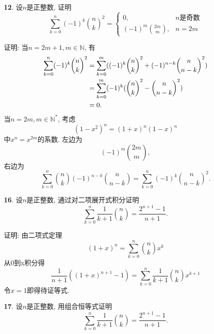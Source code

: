 \par \textbf{12}. 设$n$是正整数, 证明
\begin{displaymath}
\sum^{n}_{k=0}(-1)^{k}\binom{n}{k}^2=
\begin{cases}
0,& n\text{是奇数}\\
(-1)^m\binom{2m}{m}, & n=2m
\end{cases}
\end{displaymath}
\par 证明: 当$n=2m+1,m\in\mathbb{N}$, 有
\begin{align*}
\sum^{n}_{k=0}(-1)^{k}\binom{n}{k}^2
&=\sum^{m}_{k=0}((-1)^{k}\binom{n}{k}^2+(-1)^{n-k}\binom{n}{n-k}^2)\notag\\
&=\sum^{m}_{k=0}(-1)^{k}(\binom{n}{k}^2-\binom{n}{n-k}^2)\notag\\
&=0. \notag
\end{align*}
当$n=2m,m\in\mathbb{N}^*$, 考虑
\begin{displaymath}
(1-x^2)^n=(1+x)^n(1-x)^n
\end{displaymath}
中$x^n=x^{2m}$的系数. 左边为
\begin{displaymath}
(-1)^m\binom{2m}{m},
\end{displaymath}
右边为
\begin{displaymath}
\sum_{k=0}^n\binom{n}{k}(-1)^{n-k}\binom{n}{n-k}=
\sum_{k=0}^n(-1)^{k}\binom{n}{n-k}^2.
\end{displaymath}

\par \textbf{16}. 设$n$是正整数, 通过对二项展开式积分证明
\begin{displaymath}
\sum_{k=0}^n \frac{1}{k+1}\binom{n}{k}=\frac{2^{n+1}-1}{n+1}.
\end{displaymath}
\par 证明: 由二项式定理
\begin{displaymath}
(1+x)^n=\sum_{k=0}^n\binom{n}{k}x^k
\end{displaymath}
从0到x积分得
\begin{displaymath}
\frac{1}{n+1}((1+x)^{n+1}-1)
=\sum_{k=0}^n\frac{1}{k+1}\binom{n}{k}x^{k+1}
\end{displaymath}
令$x=1$即得待证等式.

\par \textbf{17}. 设$n$是正整数, 用组合恒等式证明
\begin{displaymath}
\sum_{k=0}^n \frac{1}{k+1}\binom{n}{k}=\frac{2^{n+1}-1}{n+1}.
\end{displaymath}

